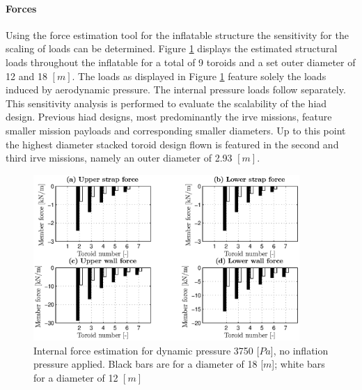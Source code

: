 \paragraph{Forces}

Using the force estimation tool for the inflatable structure the sensitivity for the scaling of loads can be determined. Figure \ref{fig:forces} displays the estimated structural loads throughout the inflatable for a total of 9 toroids and a set outer diameter of 12 and 18 $[m]$. The loads as displayed in Figure \ref{fig:forces} feature solely the loads induced by aerodynamic pressure. The internal pressure loads follow separately. This sensitivity analysis is performed to evaluate the scalability of the \gls{hiad} design. Previous \gls{hiad} designs, most predominantly the \gls{irve} missions, feature smaller mission payloads and corresponding smaller diameters. Up to this point the highest diameter stacked toroid design flown is featured in the second and third \gls{irve} missions, namely an outer diameter of 2.93 $[m]$. 

\begin{figure}[h]
	\centering
	\includegraphics[width=0.9\textwidth]{./Figure/Structure/forces_nopress_test.eps}
	\caption[{Internal force estimation for dynamic pressure 3750 [$Pa$], no inflation pressure applied}]{Internal force estimation for dynamic pressure 3750 [$Pa$], no inflation pressure applied. Black bars are for a diameter of 18 [$m$]; white bars for a diameter of 12 $[m]$}
	\label{fig:forces}
\end{figure}

